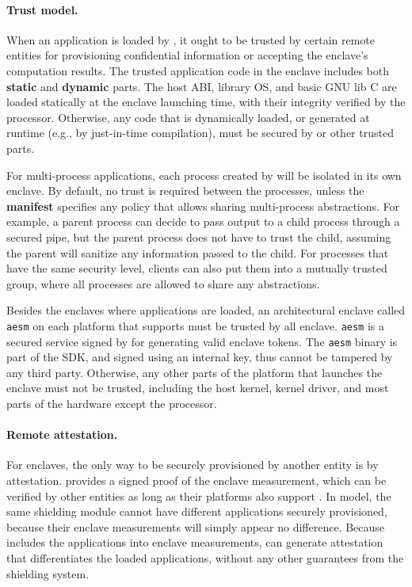 \paragraph{Trust model.}
When an application is loaded by \sysname{}, it ought to be trusted by
certain remote entities
for provisioning confidential information or
accepting the enclave's computation results.
The trusted application code in the enclave includes both
{\bf static} and {\bf dynamic} parts.
The host ABI, library OS, and basic GNU lib C are loaded statically
at the enclave launching time,
with their integrity verified by the processor.
Otherwise, any code that is dynamically loaded, or generated at runtime
(e.g., by just-in-time compilation),
must be secured by \sysname{} or other trusted parts.

For multi-process applications, each process created by \sysname{}
will be isolated in its own enclave.
By default, no trust is required between the processes,
unless the {\bf manifest} specifies any policy
that allows sharing multi-process abstractions.
For example, a parent process can decide to pass output to a child process
through a secured pipe,
but the parent process does not have to trust the child, assuming
the parent will sanitize any information passed to the child.
For processes that have the same security level,
clients can also put them into a mutually trusted group,
where all processes are allowed to share any abstractions.

Besides the enclaves where applications are loaded,
an architectural enclave called {\tt aesm} on each platform that supports \sgx{}
must be trusted by all enclave.
{\tt aesm} is a secured service signed by \intel{} for generating
valid enclave tokens.
The {\tt aesm} binary is part of the \sgx{} SDK,
and signed using an \intel{} internal key, thus cannot be
tampered by any third party.
Otherwise, any other parts of the platform that launches the enclave
must not be trusted, including the host kernel,
\sgx{} kernel driver, and most parts of the hardware except the processor.

\paragraph{Remote attestation.}
For enclaves, the only way to be securely provisioned by another entity
is by attestation.
\sgx{} provides a signed proof of the enclave measurement,
which can be verified by other entities as long as their platforms
also support \sgx{}.
In \haven{} model, the same shielding module cannot have different applications
securely provisioned, because their enclave measurements will simply
appear no difference.
Because \sysname{} includes the applications into enclave measurements,
\sgx{} can generate attestation that differentiates the loaded applications,
without any other guarantees from the shielding system.

